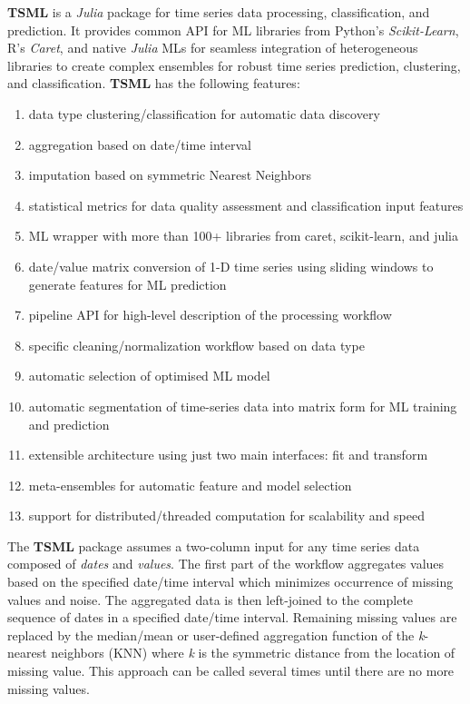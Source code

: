 \documentclass{juliacon}
\begin{document}
\textbf{TSML}\cite{tsml2019} is a \emph{Julia}\cite{bezanson2017julia} package for time series data processing, classification, and prediction. 
It provides common API for ML libraries from Python's \emph{Scikit-Learn}, 
R's \emph{Caret}, and native \emph{Julia} MLs for seamless integration of heterogeneous 
libraries to create complex ensembles for robust time series prediction, clustering, and classification.
\textbf{TSML} has the following features:
\begin{enumerate}
\item data type clustering/classification for automatic data discovery
\item aggregation based on date/time interval
\item imputation based on symmetric Nearest Neighbors
\item statistical metrics for data quality assessment and classification input features
\item ML wrapper with more than 100+ libraries from caret, scikit-learn, and julia
\item date/value matrix conversion of 1-D time series using sliding windows to generate features for ML prediction
\item pipeline API for high-level description of the processing workflow
\item specific cleaning/normalization workflow based on data type
\item automatic selection of optimised ML model
\item automatic segmentation of time-series data into matrix form for ML training and prediction 
\item extensible architecture using just two main interfaces: fit and transform
\item meta-ensembles for automatic feature and model selection
\item support for distributed/threaded computation for scalability and speed
\end{enumerate}

The \textbf{TSML} package assumes a two-column input for any time series data composed of \emph{dates} and \emph{values}. The first part of the workflow aggregates values based on the specified date/time interval which minimizes occurrence of missing values and noise. The aggregated data is then left-joined to the complete sequence of dates in a specified date/time interval. Remaining missing values are replaced by the median/mean or user-defined aggregation function of the \textit{k}-nearest neighbors (KNN) where \textit{k} is the symmetric distance from the location of missing value. This approach can be called several times until there are no more missing values.
\end{document}
